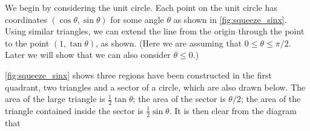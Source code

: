 {We begin by considering the unit circle. Each point on the unit circle has coordinates $(\cos \theta,\sin \theta)$ for some angle $\theta$ as shown in \autoref{fig:squeeze_sinx}. Using similar triangles, we can extend the line from the origin through the point to the point $(1,\tan \theta)$, as shown. (Here we are assuming that $0\leq \theta \leq \pi/2$. Later we will show that we can also consider $\theta \leq 0$.)


\autoref{fig:squeeze_sinx} shows three regions have been constructed in the first quadrant, two triangles and a sector of a circle, which are also drawn below. The area of the large triangle is $\frac12\tan\theta$; the area of the sector is $\theta/2$; the area of the triangle contained inside the sector is $\frac12\sin\theta$. It is then clear from the diagram that 

}

